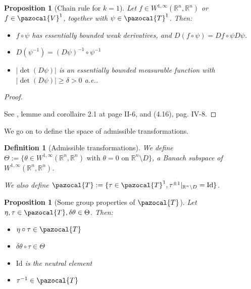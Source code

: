 \documentclass[english,a4paper,9pt,oneside]{scrbook}	%
\theoremstyle{break}
\newtheorem{defn}[equation]{Definition}
\newtheorem{prop}[equation]{Proposition}
\newenvironment{mproof}[1][\proofname]{%
  \begin{proof}[#1]$ $\par\nobreak\ignorespaces
}{%
  \end{proof}
}
\renewcommand*{\proofname}{Proof}
\theoremstyle{remark}
\newcommand{\mR}{\mathbb{R}}
\newcommand{\cV}{\pazocal{V}}
\newcommand{\cT}{\pazocal{T}}
\newcommand{\id}{\text{Id}}
\newcommand{\te}{\theta}
\newcommand{\Te}{\Theta}
\begin{document}
\begin{appendices}
\begin{prop}[Chain rule for $k=1$]
\label{prop:chain}
Let $f \in W^{1,\infty}(\mR^n,\mR^n)$ or $f \in \cV^1$, together with $\psi \in \cT^1$.  Then:

\begin{itemize}

\item $f \circ \psi$ has essentially bounded weak derivatives, and $D(f \circ \psi) = Df \circ \psi D\psi$.

\item  $D(\psi^{-1}) = (D\psi)^{-1} \circ \psi^{-1}$

\item $|\det(D\psi)|$ is an essentially bounded measurable function with $|\det(D\psi)|\geq \delta>0$ a.e.. 
\end{itemize} 

\end{prop}
\begin{mproof}
See \cite{murat}, lemme and corollaire 2.1 at page II-6, and (4.16), pag. IV-8.
\end{mproof}

We go on to define the space of admissible transformations.

\begin{defn}[Admissible transformations]
\label{def:adm}
We define $\Theta:=\{\theta \in W^{1,\infty}(\mR^n,\mR^n) \text{ with } \theta=0 \text{ on } \mR^n \setminus D\}$, a Banach subspace of $ W^{1,\infty}(\mR^n,\mR^n)$.


We also define $\cT:=\{\tau \in \cT^1, \tau^{\pm 1}|_{\mR^n\setminus D}=\id\}$. 

\end{defn}

\begin{prop}[Some group properties of $\cT$]
\label{prop:group}
Let $\eta, \tau \in \cT, \delta \te \in \Te$. Then:

\begin{itemize}
	\item $\eta \circ \tau \in \cT$
	\item $\delta \te \circ \tau \in \Te$
	\item $\id$ is the neutral element
	\item $\tau^{-1} \in \cT$
\end{itemize}


\end{prop}
\end{appendices}
\end{document}
